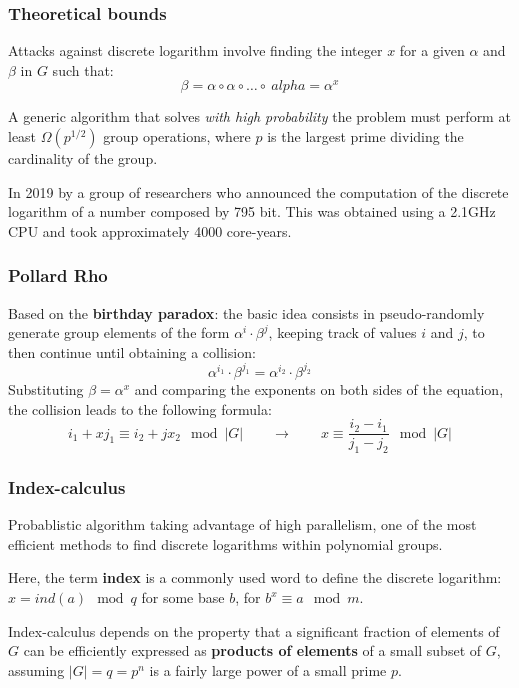 \documentclass{beamer}
\begin{document}
\begin{frame}
\frametitle{Theoretical bounds}
Attacks against discrete logarithm involve finding the integer $x$ for a given $\alpha$ and $\beta$ in $G$ such that:
$$\beta = \alpha \circ \alpha \circ \dots \circ \ alpha = \alpha^x$$

A generic algorithm that solves \textit{with high probability} the problem must perform at least $\Omega(p^{1/2})$ group operations, where $p$ is the largest prime dividing the cardinality of the group. 

In 2019 by a group of researchers who announced the computation of the discrete logarithm of a number composed by 795 bit. This was obtained using a 2.1GHz CPU and took approximately 4000 core-years.

\end{frame}


\begin{frame}
\frametitle{Pollard Rho}
Based on the \textbf{birthday paradox}: the basic idea consists in pseudo-randomly generate group elements of the form $\alpha^i \cdot \beta^j$, keeping track of values $i$ and $j$, to then continue until obtaining a collision:
$$\alpha^{i_1} \cdot \beta^{j_1} = \alpha^{i_2} \cdot \beta^{j_2}$$
Substituting $\beta = \alpha^x$ and comparing the exponents on both sides of the equation, the collision leads to the following formula:
$$i_1 + xj_1 \equiv i_2 + jx_2 \mod |G| \qquad \rightarrow \qquad x \equiv \frac{i_2 - i_1}{j_1 - j_2} \mod |G|$$ 
\end{frame}


\begin{frame}
\frametitle{Index-calculus}

Probablistic algorithm taking advantage of high parallelism, one of the most efficient methods to find discrete logarithms within polynomial groups.

Here, the term \textbf{index} is a commonly used word to define the discrete logarithm: $x = ind(a) \mod q$ for some base $b$, for $b^x \equiv a \mod m$.

Index-calculus depends on the property that a significant fraction of elements of $G$ can be efficiently expressed as \textbf{products of elements} of a small subset of $G$, assuming $|G|= q = p^n$ is a fairly large power of a small prime $p$. 

\end{frame}
\end{document}
